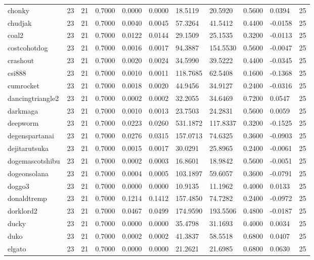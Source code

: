 \begin{table}[htbp]
\begin{tabular}{lllllllllll}
chonky & 23 & 21 & 0.7000 & 0.0000 & 0.0000 & 18.5119 & 20.5920 & 0.5600 & 0.0394 & 25 \\
chudjak & 23 & 21 & 0.7000 & 0.0040 & 0.0045 & 57.3264 & 41.5412 & 0.4400 & -0.0158 & 25 \\
coal2 & 23 & 21 & 0.7000 & 0.0122 & 0.0144 & 29.1509 & 25.1535 & 0.3200 & -0.0113 & 25 \\
costcohotdog & 23 & 21 & 0.7000 & 0.0016 & 0.0017 & 94.3887 & 154.5530 & 0.5600 & -0.0047 & 25 \\
crashout & 23 & 21 & 0.7000 & 0.0020 & 0.0024 & 34.5990 & 39.5222 & 0.4400 & -0.0345 & 25 \\
csi888 & 23 & 21 & 0.7000 & 0.0010 & 0.0011 & 118.7685 & 62.5408 & 0.1600 & -0.1368 & 25 \\
cumrocket & 23 & 21 & 0.7000 & 0.0018 & 0.0020 & 44.9456 & 34.9127 & 0.2400 & -0.0316 & 25 \\
dancingtriangle2 & 23 & 21 & 0.7000 & 0.0002 & 0.0002 & 32.2055 & 34.6469 & 0.7200 & 0.0547 & 25 \\
darkmaga & 23 & 21 & 0.7000 & 0.0010 & 0.0013 & 23.7503 & 24.2831 & 0.5600 & 0.0059 & 25 \\
deepworm & 23 & 21 & 0.7000 & 0.0223 & 0.0260 & 531.1872 & 117.8337 & 0.3200 & -0.1525 & 25 \\
degenspartanai & 23 & 21 & 0.7000 & 0.0276 & 0.0315 & 157.0713 & 74.6325 & 0.3600 & -0.0903 & 25 \\
dejitarutsuka & 23 & 21 & 0.7000 & 0.0015 & 0.0017 & 30.0291 & 25.8965 & 0.2400 & -0.0061 & 25 \\
dogemascotshibu & 23 & 21 & 0.7000 & 0.0002 & 0.0003 & 16.8601 & 18.9842 & 0.5600 & -0.0051 & 25 \\
dogeonsolana & 23 & 21 & 0.7000 & 0.0004 & 0.0005 & 103.1897 & 59.6057 & 0.3600 & -0.0791 & 25 \\
doggo3 & 23 & 21 & 0.7000 & 0.0000 & 0.0000 & 10.9135 & 11.1962 & 0.4000 & 0.0133 & 25 \\
donaldtremp & 23 & 21 & 0.7000 & 0.1214 & 0.1412 & 157.4850 & 74.7282 & 0.2400 & -0.0972 & 25 \\
dorklord2 & 23 & 21 & 0.7000 & 0.0467 & 0.0499 & 174.9590 & 193.5506 & 0.4800 & -0.0187 & 25 \\
ducky & 23 & 21 & 0.7000 & 0.0000 & 0.0000 & 35.4798 & 31.1693 & 0.4000 & 0.0034 & 25 \\
duko & 23 & 21 & 0.7000 & 0.0002 & 0.0002 & 41.3837 & 58.5518 & 0.6800 & 0.0407 & 25 \\
elgato & 23 & 21 & 0.7000 & 0.0000 & 0.0000 & 21.2621 & 21.6985 & 0.6800 & 0.0630 & 25 \\

\end{tabular}
\end{table}
